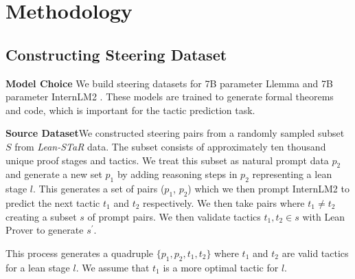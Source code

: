 \section{Methodology}
\subsection{Constructing Steering Dataset}

\textbf{Model Choice} \quad
We build steering datasets for 7B parameter Llemma \cite{llemma} and 7B parameter InternLM2 \cite{internlm}. These models are trained to generate formal theorems  and code, which is important for the tactic prediction task.

\textbf{Source Dataset}\quad We constructed steering pairs from a randomly sampled subset $S$ from \textit{Lean-STaR} data. The subset consists of approximately ten thousand unique proof stages and tactics. We treat this subset as natural prompt data $p_{2}$ and generate a new set  $p_{1}$ by adding reasoning steps in $p_{2}$ representing a lean stage $l$. This generates a set of pairs ($p_{1}$, $p_{2}$) which we then prompt InternLM2 to predict the next tactic $t_{1}$ and $t_{2}$ respectively. We then take pairs where $t_{1} \neq t_{2}$ creating a subset $s$
of prompt pairs. We then validate tactics $t_1, t_2 \in s$ with Lean Prover to generate $s^{\prime}$.

This process generates a quadruple $\{p_1, p_2, t_1, t_2\}$ where $t_1$ and $t_2$ are valid tactics for a lean stage $l$. We assume that $t_1$ is a more optimal tactic for $l$. 

